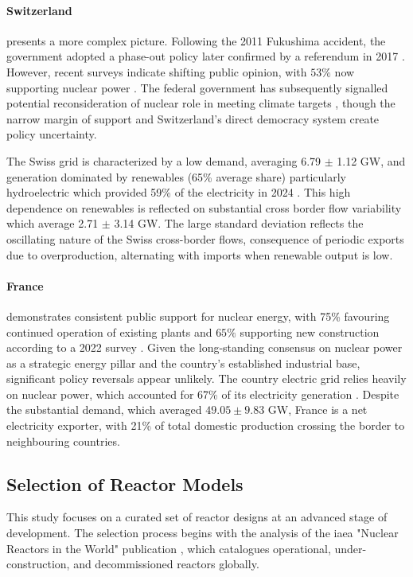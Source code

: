 \paragraph{Switzerland} presents a more complex picture. Following the 2011 Fukushima accident, the government adopted a phase-out policy later confirmed by a referendum in 2017 \cite{WorldNuclear_Switzerland_Profile_2025}. However, recent surveys indicate shifting public opinion, with $53\%$ now supporting nuclear power \cite{Euronuclear_Swiss_Nuclear_Poll_2023,NucNet_Nuclear_Support_Survey_2023,WorldNuclearNews_Swiss_Nuclear_Poll_2023}. The federal government has subsequently signalled potential reconsideration of nuclear role in meeting climate targets \cite{swissinfo_Nuclear_Power_Switzerland_2025}, though the narrow margin of support and Switzerland's direct democracy system create policy uncertainty. 

The Swiss grid is characterized by a low demand, averaging 6.79 $\pm$ 1.12 GW, and generation dominated by renewables (65\% average share) particularly hydroelectric which provided 59\% of the electricity in 2024 \cite{IEA_Electricity_2024}. This high dependence on renewables is reflected on substantial cross border flow variability which average 2.71 $\pm$ 3.14 GW. The large standard deviation reflects the oscillating nature of the Swiss cross-border flows, consequence of periodic exports due to overproduction, alternating with imports when renewable output is low.\\

\paragraph{France} demonstrates consistent public support for nuclear energy, with 75\% favouring continued operation of existing plants and $65\%$ supporting new construction according to a 2022 survey \cite{IFOP_Nuclear_Perception_2023}. Given the long-standing consensus on nuclear power as a strategic energy pillar and the country's established industrial base, significant policy reversals appear unlikely. The country electric grid relies heavily on nuclear power, which accounted for 67\% of its electricity generation \cite{IEA_Electricity_2024}. Despite the substantial demand, which averaged $49.05 \pm 9.83$ GW, France is a net electricity exporter, with 21\% of total domestic production crossing the border to neighbouring countries.

\subsection{Selection of Reactor Models}
This study focuses on a curated set of reactor designs at an advanced stage of development.
The selection process begins with the analysis of the \gls{iaea} "Nuclear Reactors in the World" publication \cite{international2024iaea}, which catalogues operational, under-construction, and decommissioned reactors globally. \\

